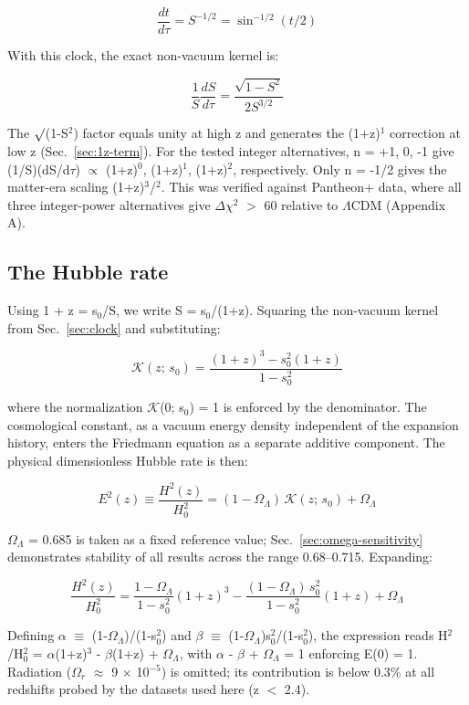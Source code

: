 \[\frac{dt}{d\tau} = S^{-1/2} = \sin^{-1/2}(t/2)\]

With this clock, the exact non-vacuum kernel is:

\[\frac{1}{S}\frac{dS}{d\tau} = \frac{\sqrt{1 - S^2}}{2S^{3/2}}\]

The $\surd$(1-S$^2$) factor equals unity at high z and generates the (1+z)$^1$
correction at low z (Sec.~\ref{sec:1z-term}). For the tested integer alternatives, n = +1,
0, -1 give (1/S)(dS/d$\tau$) $\propto$ (1+z)$^0$, (1+z)$^1$, (1+z)$^2$, respectively. Only n =
-1/2 gives the matter-era scaling (1+z)$^3$/$^2$. This was verified against
Pantheon+ data, where all three integer-power alternatives give $\Delta\chi^2$
$>$ 60 relative to $\Lambda$CDM (Appendix A).

\subsection{The Hubble rate}\label{sec:hubble}

Using 1 + z = s$_0$/S, we write S = s$_0$/(1+z). Squaring the non-vacuum
kernel from Sec.~\ref{sec:clock} and substituting:

\[\mathcal{K}(z;\,s_0) = \frac{(1+z)^3 - s_0^2(1+z)}{1 - s_0^2}\]

where the normalization $\mathcal{K}$(0; s$_0$) = 1 is enforced by the denominator. The
cosmological constant, as a vacuum energy density independent of the
expansion history, enters the Friedmann equation \cite{ref15} as a separate
additive component. The physical dimensionless Hubble rate is then:

\[E^2(z) \equiv \frac{H^2(z)}{H_0^2} = (1 - \Omega_\Lambda)\,\mathcal{K}(z;\,s_0) + \Omega_\Lambda\]

$\Omega_\Lambda$ = 0.685 is taken as a fixed reference value; Sec.~\ref{sec:omega-sensitivity} demonstrates
stability of all results across the range 0.68--0.715. Expanding:

\[\frac{H^2(z)}{H_0^2} = \frac{1 - \Omega_\Lambda}{1 - s_0^2}(1+z)^3 - \frac{(1 - \Omega_\Lambda)\,s_0^2}{1 - s_0^2}(1+z) + \Omega_\Lambda\]

Defining $\alpha$ $\equiv$ (1-$\Omega_\Lambda$)/(1-s$_0^2$) and $\beta$ $\equiv$ (1-$\Omega_\Lambda$)s$_0^2$/(1-s$_0^2$), the
expression reads H$^2$/H$_0^2$ = $\alpha$(1+z)$^3$ - $\beta$(1+z) + $\Omega_\Lambda$, with $\alpha$ - $\beta$ + $\Omega_\Lambda$ = 1
enforcing E(0) = 1. Radiation ($\Omega_r$ $\approx$ 9 $\times$ 10$^{-5}$) is omitted; its
contribution is below 0.3\% at all redshifts probed by the datasets used
here (z $<$ 2.4).

